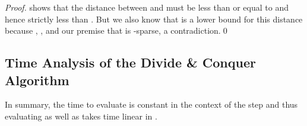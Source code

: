 \begin{isabellebody}
\begin{isamarkuptext}
\begin{proof}
shows that the distance between  and  must be less than or equal to  and hence
strictly less than \isa{{\isasymdelta}}. But we also know that \isa{{\isasymdelta}} is a lower bound for this distance because ,
,  and our premise that  is \isa{{\isasymdelta}}-sparse, a contradiction.\qed
\end{proof}

\subsection{Time Analysis of the Divide \& Conquer Algorithm}

In summary, the time to evaluate  is constant in the context of the  step
and thus evaluating  as well as 
takes time linear in .


\end{isamarkuptext}
\end{isabellebody}
